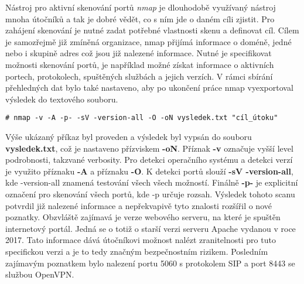 Nástroj pro aktivní skenování portů \textit{nmap} je dlouhodobě využívaný nástroj mnoha útočníků a tak je dobré vědět, co s ním jde o daném cíli zjistit.
Pro zahájení skenování je nutné zadat potřebné vlastnosti skenu a definovat cíl.
Cílem je samozřejmě již zmíněná organizace, nmap přijímá informace o doméně, jedné nebo i skupině adres což jsou již nalezené informace.
Nutné je specifikovat možnosti skenování portů, je například možné získat informace o aktivních portech, protokolech, spuštěných službách a jejich verzích.
V rámci sbírání přehledných dat bylo také nastaveno, aby po ukončení práce nmap vyexportoval výsledek do textového souboru.
\begin{codeblock}
	\begin{verbatim}
# nmap -v -A -p- -sV -version-all -O -oN vysledek.txt "cíl_útoku"
	\end{verbatim}
\end{codeblock}

Výše ukázaný příkaz byl proveden a výsledek byl vypsán do souboru \textbf{vysledek.txt}, což je nastaveno přízviskem \textbf{-oN}.
Příznak \textbf{-v} označuje vyšší level podrobnosti, takzvané verbosity.
Pro detekci operačního systému a detekci verzí je využito příznaku \textbf{-A} a příznaku \textbf{-O}.
K detekci portů slouží \textbf{-sV -version-all}, kde -version-all znamená testování všech všech možností.
Finálně \textbf{-p-} je explicitní označení pro skenování všech portů, kde -p určuje rozsah.
Výsledek tohoto scanu potvrdil již nalezené informace a nepřekvapivě tyto znalosti rozšířil o nové poznatky.
Obzvláště zajímavá je verze webového serveru, na které je spuštěn internetový portál.
Jedná se o totiž o starší verzi serveru Apache vydanou v roce 2017.
Tato informace dává útočníkovi možnost nalézt zranitelnosti pro tuto specifickou verzi a je to tedy značným bezpečnostním rizikem.
Posledním zajímavým poznatkem bylo nalezení portu 5060 s protokolem SIP a port 8443 se službou OpenVPN\@.

